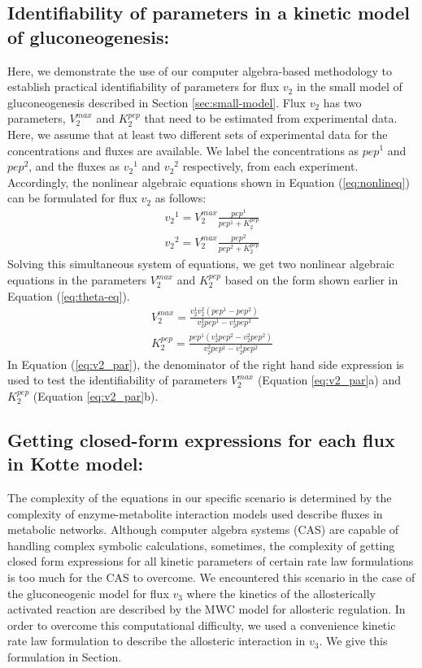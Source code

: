 \documentclass[10pt]{article}
\begin{document}
\subsection{Identifiability of parameters in a kinetic model of gluconeogenesis:}\label{sec:example}
Here, we demonstrate the use of our computer algebra-based methodology to establish practical identifiability of parameters for flux $v_2$ in the small model of gluconeogenesis described in Section \ref{sec:small-model}. Flux $v_2$ has two parameters, $V_2^{max}$ and $K_2^{pep}$ that need to be estimated from experimental data. Here, we assume that at least two different sets of experimental data for the concentrations and fluxes are available. We label the concentrations as ${pep}^1$ and ${pep}^2$, and the fluxes as ${v_2}^1$ and ${v_2}^2$ respectively, from each experiment. Accordingly, the nonlinear algebraic equations shown in Equation (\ref{eq:nonlineq}) can be formulated for flux $v_2$ as follows:
\begin{subequations}\label{eq:nonlin-flux2}
	\begin{align}
	{v_2}^1 = V_{2}^{max}\frac{pep^1}{pep^1+K_{2}^{pep}}\\
	{v_2}^2 = V_{2}^{max}\frac{pep^2}{pep^2+K_{2}^{pep}}
	\end{align}
\end{subequations}
Solving this simultaneous system of equations, we get two nonlinear algebraic equations in the parameters $V_2^{max}$ and $K_2^{pep}$ based on the form shown earlier in Equation (\ref{eq:theta-eq}).
\begin{subequations}\label{eq:v2_par}
	\begin{align}		
	V_2^{max} = \frac{v_2^1v_2^2(pep^1-pep^2)}{v_2^2pep^1-v_2^1pep^2}\\
	K_2^{pep} = \frac{pep^1(v_2^1pep^2-v_2^2pep^2)}{v_2^2pep^1-v_2^1pep^2}
	\end{align}
\end{subequations}
In Equation (\ref{eq:v2_par}), the denominator of the right hand side expression is used to test the identifiability of parameters $V_2^{max}$ (Equation \ref{eq:v2_par}a) and $K_2^{pep}$ (Equation \ref{eq:v2_par}b).

\subsection{Getting closed-form expressions for each flux in Kotte model:}\label{sec:closedform}
The complexity of the equations in our specific scenario is determined by the complexity of enzyme-metabolite interaction models used describe fluxes in metabolic networks. Although computer algebra systems (CAS) are capable of handling complex symbolic calculations, sometimes, the complexity of getting closed form expressions for all kinetic parameters of certain rate law formulations is too much for the CAS to overcome. We encountered this scenario in the case of the gluconeogenic model for flux $v_3$ where the kinetics of the allosterically activated reaction are described by the MWC model for allosteric regulation. In order to overcome this computational difficulty, we used a convenience kinetic rate law formulation to describe the allosteric interaction in $v_3$. We give this formulation in Section.
\end{document}
